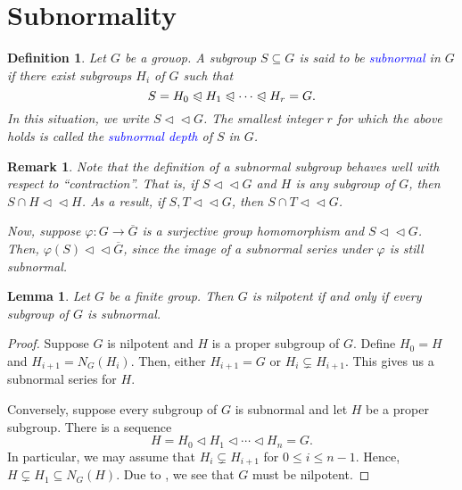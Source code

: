 \documentclass[12pt]{article}
\theoremstyle{thmstyle}
\newtheorem{lemma}[theorem]{Lemma}
\theoremstyle{defstyle}
\newtheorem{definition}[theorem]{Definition}
\newtheorem{remark}[theorem]{Remark}
\newcommand{\define}[1]{\textcolor{blue}{\textit{#1}}}
\renewcommand{\le}{\leqslant}
\newcommand{\nor}{\vartriangleleft}
\newcommand{\noreq}{\trianglelefteqslant}
\newcommand{\subnor}{\nor\!\nor}
\begin{document}
\section{Subnormality}

\begin{definition}
    Let $G$ be a grouop. A subgroup $S\subseteq G$ is said to be \define{subnormal} in $G$ if there exist subgroups $H_i$ of $G$ such that 
    \begin{equation*}
        S = H_0\noreq H_1\noreq\cdots\noreq H_r = G.
    \end{equation*}
    In this situation, we write $S\nor\nor G$. The smallest integer $r$ for which the above holds is called the \define{subnormal depth} of $S$ in $G$.
\end{definition}

\begin{remark}
    Note that the definition of a subnormal subgroup behaves well with respect to ``contraction''. That is, if $S\subnor G$ and $H$ is any subgroup of $G$, then $S\cap H\subnor H$. As a result, if $S, T\subnor G$, then $S\cap T\subnor G$.

    Now, suppose $\varphi: G\to\overline G$ is a surjective group homomorphism and $S\subnor G$. Then, $\varphi(S)\subnor\overline G$, since the image of a subnormal series under $\varphi$ is still subnormal.
\end{remark}

\begin{lemma}
    Let $G$ be a finite group. Then $G$ is nilpotent if and only if every subgroup of $G$ is subnormal.
\end{lemma}
\begin{proof}
    Suppose $G$ is nilpotent and $H$ is a proper subgroup of $G$. Define $H_0 = H$ and $H_{i + 1} = N_G(H_i)$. Then, either $H_{i + 1} = G$ or $H_i\subsetneq H_{i + 1}$. This gives us a subnormal series for $H$.

    Conversely, suppose every subgroup of $G$ is subnormal and let $H$ be a proper subgroup. There is a sequence 
    \begin{equation*}
        H = H_0\nor H_1\nor\cdots\nor H_n = G.
    \end{equation*}
    In particular, we may assume that $H_i\subsetneq H_{i + 1}$ for $0\le i\le n - 1$. Hence, $H\subsetneq H_1\subseteq N_G(H)$. Due to , we see that $G$ must be nilpotent.
\end{proof}
\end{document}
